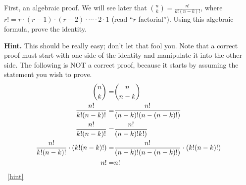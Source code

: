 \documentclass{book}
\begin{document}
\setcounter{project}{72}
\addtocounter{project}{-1}
\begin{activity}[]\label{activity-65}
\hypertarget{p-580}{}%
First, an algebraic proof.  We will see later that \(\binom{n}{k} = \frac{n!}{k!(n-k)!}\), where \(r! = r \cdot (r-1) \cdot (r-2) \cdot\cdots\cdot 2\cdot 1\) (read ``\(r\) factorial'').  Using this algebraic formula, prove the identity.%
\par\smallskip%
\noindent\textbf{Hint.}\hypertarget{hint-27}{}\quad%
\hypertarget{p-581}{}%
This should be really easy; don't let that fool you.  Note that a correct proof must start with one side of the identity and manipulate it into the other side.  The following is NOT a correct proof, because it starts by assuming the statement you wish to prove.%
\begin{align*}
\binom{n}{k}  = & \binom{n}{n-k}\\
\frac{n!}{k!(n-k)!} =  & \frac{n!}{(n-k)!(n-(n-k)!)}\\
\frac{n!}{k!(n-k)!} =  & \frac{n!}{(n-k)!k!)}\\
\frac{n!}{k!(n-k)!} \cdot (k!(n-k)!)=  & \frac{n!}{(n-k)!(n-(n-k)!)}\cdot(k!(n-k)!)\\
n! =  & n!
\end{align*}
%
~\hfill{\tiny\hyperlink{a-72}{[hint]}\hypertarget{q-72}{}}\end{activity}
\end{document}
